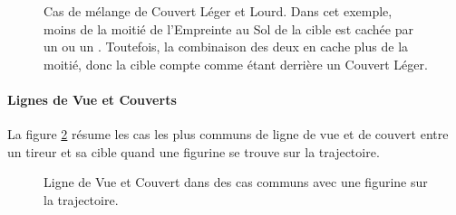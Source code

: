 \begin{figure}[!htbp]
\begin{minipage}[t]{0.55\textwidth}
\def\svgwidth{\textwidth}

\end{minipage}\hfill\begin{minipage}[b]{0.42\textwidth}
\caption{Cas de mélange de Couvert Léger et Lourd.\vspace*{10pt}\newline
Dans cet exemple, moins de la moitié de l'Empreinte au Sol de la cible est cachée par un \softterrain{} ou un \hardterrain{}. Toutefois, la combinaison des deux en cache plus de la moitié, donc la cible compte comme étant derrière un Couvert Léger.}
\label{figure/soft_and_hard_cover}
\end{minipage}
\end{figure}

\clearpage
\paragraph{Lignes de Vue et Couverts}

La figure \ref{figure/line_of_sight_and_cover} résume les cas les plus communs de ligne de vue et de couvert entre un tireur et sa cible quand une figurine se trouve sur la trajectoire.

\newcommand{\figureLoSCSoftcover}{\Largefontsize{Couvert Léger (-1)}}
\newcommand{\figureLoSCHardcover}{\Largefontsize{Couvert Lourd (-2)}}
\newcommand{\figureLoSCNocover}{\Largefontsize{Pas de Couvert}}
\newcommand{\figureLoSCNolineofsight}{\Largefontsize{Pas de Ligne de Vue}}
\newcommand{\figureLoSCSmall}{Standard}
\newcommand{\figureLoSCMedium}{Grande}
\newcommand{\figureLoSCLarge}{Gigantesque}

\begin{figure}[!htbp]
\centering
\def\svgwidth{12cm}

\caption{Ligne de Vue et Couvert dans des cas communs avec une figurine sur la trajectoire.}
\label{figure/line_of_sight_and_cover}
\end{figure}

